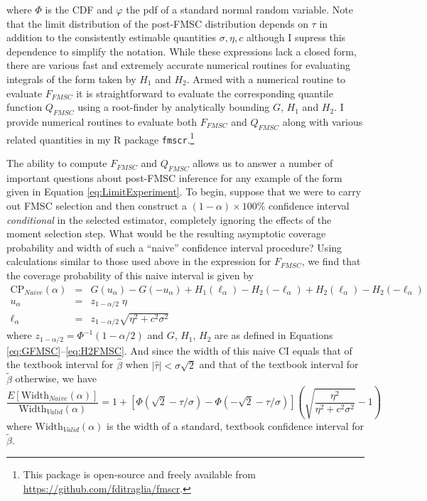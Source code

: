 where $\Phi$ is the CDF and $\varphi$ the pdf of a standard normal random variable.
Note that the limit distribution of the post-FMSC distribution depends on $\tau$ in addition to the consistently estimable quantities $\sigma, \eta, c$ although I supress this dependence to simplify the notation.
While these expressions lack a closed form, there are various fast and extremely accurate numerical routines for evaluating integrals of the form taken by $H_1$ and $H_2$.
Armed with a numerical routine to evaluate $F_{FMSC}$ it is straightforward to evaluate the corresponding quantile function $Q_{FMSC}$ using a root-finder by analytically bounding $G$, $H_1$ and $H_2$.
I provide numerical routines to evaluate both $F_{FMSC}$ and $Q_{FMSC}$ along with various related quantities in my R package \texttt{fmscr}.\footnote{This package is open-source and freely available from \url{https://github.com/fditraglia/fmscr}.}

The ability to compute $F_{FMSC}$ and $Q_{FMSC}$ allows us to answer a number of important questions about post-FMSC inference for any example of the form given in Equation \ref{eq:LimitExperiment}.
To begin, suppose that we were to carry out FMSC selection and then construct a $(1 - \alpha) \times 100\%$ confidence interval \emph{conditional} in the selected estimator, completely ignoring the effects of the moment selection step.
What would be the resulting asymptotic coverage probability and width of such a ``naive'' confidence interval procedure?
Using calculations similar to those used above in the expression for $F_{FMSC}$, we find that the coverage probability of this naive interval is given by
\begin{eqnarray*}
  \mbox{CP}_{Naive}(\alpha) &=& G(u_\alpha) - G(-u_\alpha) +  H_1(\ell_\alpha) - H_2(-\ell_\alpha) +  H_2(\ell_\alpha) - H_2(-\ell_\alpha) \\
  u_\alpha &=& z_{1-\alpha/2}\; \eta\\
  \ell_{\alpha} &=& z_{1-\alpha/2} \sqrt{\eta^2 + c^2\sigma^2}
\end{eqnarray*}
where $z_{1-\alpha/2} = \Phi^{-1}(1 -\alpha/2)$ and $G$, $H_1$, $H_2$ are as defined in Equations \ref{eq:GFMSC}--\ref{eq:H2FMSC}.
And since the width of this naive CI equals that of the textbook interval for $\widehat{\beta}$ when $|\widehat{\tau}|<\sigma\sqrt{2}$ and that of the textbook interval for $\widetilde{\beta}$ otherwise, we have
\begin{equation*}
  \frac{E\left[ \mbox{Width}_{Naive}(\alpha) \right]}{\mbox{Width}_{Valid}(\alpha)} = 1 + \left[ \Phi( \sqrt{2} - \tau/\sigma) -  \Phi( -\sqrt{2} - \tau/\sigma )\right]\left( \sqrt{\frac{\eta^2}{\eta^2 + c^2 \sigma^2}} - 1 \right)
\end{equation*}
where $\mbox{Width}_{Valid}(\alpha)$ is the width of a standard, textbook confidence interval for $\widetilde{\beta}$.

